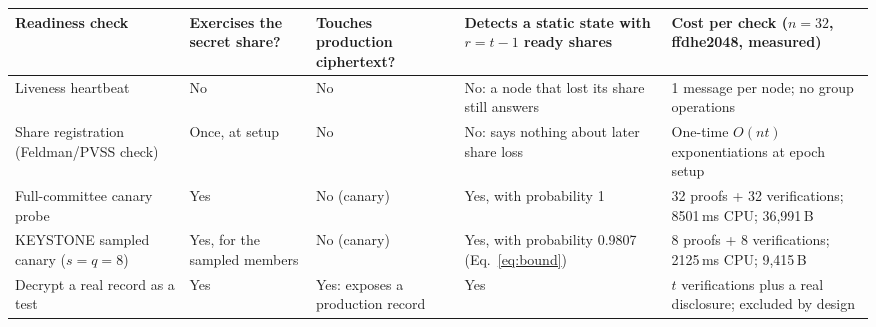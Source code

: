\begin{tabularx}{\textwidth}{@{}>{\raggedright\arraybackslash}p{}>{\raggedright\arraybackslash}p{}>{\raggedright\arraybackslash}p{}>{\raggedright\arraybackslash}p{}X@{}}
\toprule
Readiness check & Exercises the secret share? & Touches production ciphertext? & Detects a static state with $r=t-1$ ready shares & Cost per check ($n=32$, ffdhe2048, measured)\\
\midrule
Liveness heartbeat & No & No & No: a node that lost its share still answers & 1 message per node; no group operations\\
Share registration (Feldman/PVSS check) & Once, at setup & No & No: says nothing about later share loss & One-time $O(nt)$ exponentiations at epoch setup\\
Full-committee canary probe & Yes & No (canary) & Yes, with probability 1 & 32 proofs + 32 verifications; 8501\,ms CPU; 36,991\,B\\
KEYSTONE sampled canary ($s=q=8$) & Yes, for the sampled members & No (canary) & Yes, with probability 0.9807 (Eq.~\ref{eq:bound}) & 8 proofs + 8 verifications; 2125\,ms CPU; 9,415\,B\\
Decrypt a real record as a test & Yes & Yes: exposes a production record & Yes & $t$ verifications plus a real disclosure; excluded by design\\
\bottomrule
\end{tabularx}
